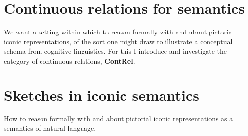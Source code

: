 \chapter{Continuous relations for semantics}\label{chapter:contrel}
We want a setting within which to reason formally with and about pictorial iconic representations, of the sort one might draw to illustrate a conceptual schema from cognitive linguistics. For this I introduce and investigate the category of continuous relations, \textbf{ContRel}.
\clearpage
\newpage

\clearpage
\newpage

\clearpage
\newpage

\clearpage
\newpage


\clearpage
\newpage
\chapter{Sketches in iconic semantics}\label{chapter:sketches}
How to reason formally with and about pictorial iconic representations as a semantics of natural language.
\clearpage
\newpage

\clearpage
\newpage

\clearpage
\newpage

\clearpage
\newpage

\clearpage
\newpage

\clearpage
\newpage





